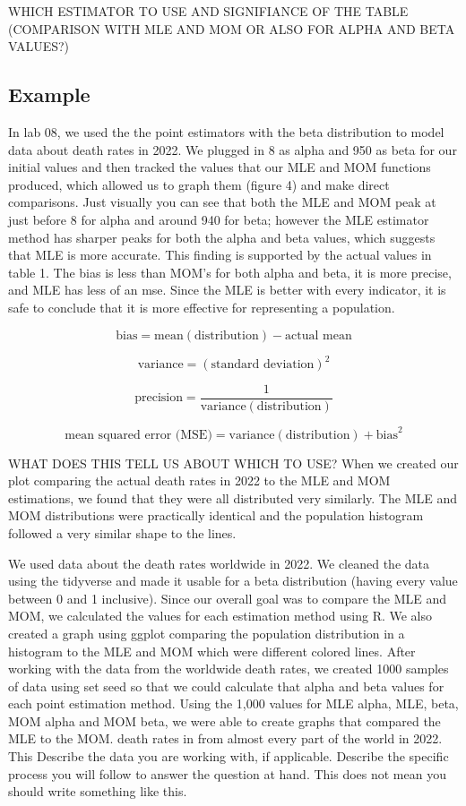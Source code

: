 \documentclass{article}\usepackage[]{graphicx}\usepackage[]{xcolor}
\begin{document}
\begin{multicols}{2}
WHICH ESTIMATOR TO USE
AND SIGNIFIANCE OF THE TABLE (COMPARISON WITH MLE AND MOM OR ALSO FOR ALPHA AND BETA VALUES?)
\subsection{Example}
  In lab 08, we used the the point estimators with the beta distribution to model data about death rates in 2022. We plugged in 8 as alpha and 950 as beta for our initial values and then tracked the values that our MLE and MOM functions produced, which allowed us to graph them (figure 4) and make direct comparisons. Just visually you can see that both the MLE and MOM peak at just before 8 for alpha and around 940 for beta; however the MLE estimator method has sharper peaks for both the alpha and beta values, which suggests that MLE is more accurate. This finding is supported by the actual values in table 1. The bias is less than MOM's for both alpha and beta, it is more precise, and MLE has less of an mse. Since the MLE is better with every indicator, it is safe to conclude that it is more effective for representing a population. 
  
\[
\text{bias} = \text{mean}(\text{distribution}) - \text{actual mean}
\]

\[
\text{variance} = (\text{standard deviation})^2
\]

\[
\text{precision} = \frac{1}{\text{variance}(\text{distribution})}
\]

\[
\text{mean squared error (MSE)} = \text{variance}(\text{distribution}) + \text{bias}^2
\]

  
  WHAT DOES THIS TELL US ABOUT WHICH TO USE?
  When we created our plot comparing the actual death rates in 2022 to the MLE and MOM estimations, we found that they were all distributed very similarly. The MLE and MOM distributions were practically identical and the population histogram followed a very similar shape to the lines. 



We used data about the death rates worldwide in 2022. We cleaned the data using the tidyverse \citep{tidyverse} 
and made it usable for a beta distribution (having every value between 0 and 1 inclusive). 
Since our overall goal was to compare the MLE and MOM, we calculated the values for each estimation  
method using R. We also created a graph using ggplot \citep{ggplot2} comparing the population distribution in a histogram to the MLE and 
MOM which were different colored lines.
After working with the data from the worldwide death rates, we created 1000 samples of data using set seed 
so that we could calculate that alpha and beta values for each point estimation method. Using the 1,000 
values for MLE alpha, MLE, beta, MOM alpha and MOM beta, we were able to create graphs that compared the MLE 
to the MOM.
death rates in from almost every part of the world in 2022. This 
Describe the data you are working with, if applicable. Describe the specific process you will follow to answer the question at hand. This does not mean you should write something like this.


\end{multicols}
\end{document}
